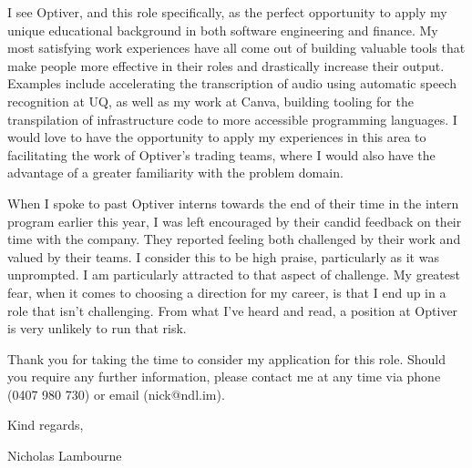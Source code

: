 \documentclass[a4paper]{article}
\begin{document}
I see Optiver, and this role specifically, as the perfect opportunity to apply my unique educational background in both software engineering and finance. My most satisfying work experiences have all come out of building valuable tools that make people more effective in their roles and drastically increase their output. Examples include accelerating the transcription of audio using automatic speech recognition at UQ, as well as my work at Canva, building tooling for the transpilation of infrastructure code to more accessible programming languages. I would love to have the opportunity to apply my experiences in this area to facilitating the work of Optiver's trading teams, where I would also have the advantage of a greater familiarity with the problem domain.

\vspace{18pt}

When I spoke to past Optiver interns towards the end of their time in the intern program earlier this year, I was left encouraged by their candid feedback on their time with the company. They reported feeling both challenged by their work and valued by their teams. I consider this to be high praise, particularly as it was unprompted. I am particularly attracted to that aspect of challenge. My greatest fear, when it comes to choosing a direction for my career, is that I end up in a role that isn't challenging.  From what I've heard and read, a position at Optiver is very unlikely to run that risk.

\vspace{18pt}

Thank you for taking the time to consider my application for this role. Should you require any further information, please contact me at any time via phone (0407 980 730) or email (nick@ndl.im).

\vspace{30pt}

Kind regards, \\

\vspace{18pt}

Nicholas Lambourne
\end{document}
